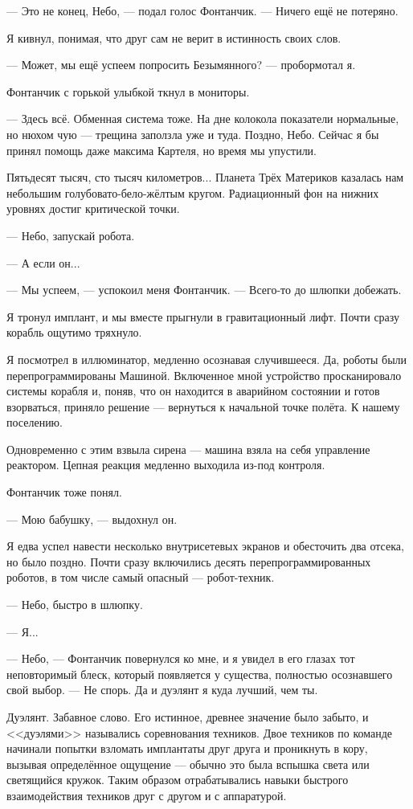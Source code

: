 --- Это не конец, Небо, --- подал голос Фонтанчик.
--- Ничего ещё не потеряно.

Я кивнул, понимая, что друг сам не верит в истинность своих слов.

--- Может, мы ещё успеем попросить Безымянного? --- пробормотал я.

Фонтанчик с горькой улыбкой ткнул в мониторы.

--- Здесь всё.
Обменная система тоже.
На дне колокола показатели нормальные, но нюхом чую --- трещина заползла уже и туда.
Поздно, Небо.
Сейчас я бы принял помощь даже максима Картеля, но время мы упустили.

Пятьдесят тысяч, сто тысяч километров...
Планета Трёх Материков казалась нам небольшим голубовато-бело-жёлтым кругом.
Радиационный фон на нижних уровнях достиг критической точки.

--- Небо, запускай робота.

--- А если он...

--- Мы успеем, --- успокоил меня Фонтанчик.
--- Всего-то до шлюпки добежать.

Я тронул имплант, и мы вместе прыгнули в гравитационный лифт.
Почти сразу корабль ощутимо тряхнуло.

Я посмотрел в иллюминатор, медленно осознавая случившееся.
Да, роботы были перепрограммированы Машиной.
Включенное мной устройство просканировало системы корабля и, поняв, что он находится в аварийном состоянии и готов взорваться, приняло решение --- вернуться к начальной точке полёта.
К нашему поселению.

Одновременно с этим взвыла сирена --- машина взяла на себя управление реактором.
Цепная реакция медленно выходила из-под контроля.

Фонтанчик тоже понял.

--- Мою бабушку, --- выдохнул он.

Я едва успел навести несколько внутрисетевых экранов и обесточить два отсека, но было поздно.
Почти сразу включились десять перепрограммированных роботов, в том числе самый опасный --- робот-техник.

--- Небо, быстро в шлюпку.

--- Я...

--- Небо, --- Фонтанчик повернулся ко мне, и я увидел в его глазах тот неповторимый блеск, который появляется у существа, полностью осознавшего свой выбор.
--- Не спорь.
Да и дуэлянт я куда лучший, чем ты.

Дуэлянт.
Забавное слово.
Его истинное, древнее значение было забыто, и <<дуэлями>> назывались соревнования техников.
Двое техников по команде начинали попытки взломать имплантаты друг друга и проникнуть в кору, вызывая определённое ощущение --- обычно это была вспышка света или светящийся кружок.
Таким образом отрабатывались навыки быстрого взаимодействия техников друг с другом и с аппаратурой.

